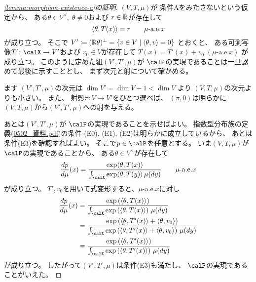 \documentclass[report]{jlreq}
\begin{document}
\begin{proof}[\cref{lemma:morphism-existence-a}の証明]
    $(V, T, \mu)$が
    条件Aをみたさないという仮定から、
    ある$\theta \in V^\vee, \; \theta \neq 0$および
    $r \in \mathbb{R}$が存在して
    \begin{equation}
        \locallabel{eq:costant-pairing}
        \langle \theta, T(x) \rangle
            = r
            \qquad
            \text{$\mu$-a.e.$x$}
    \end{equation}
    が成り立つ。
    そこで
    $V' \coloneqq (\mathbb{R}\theta)^\perp
        = \{ v \in V \mid \langle \theta, v \rangle = 0 \}$
    とおくと、
    ある可測写像$T' \colon \calX \to V'$および
    $v_0 \in V$が存在して
    $T(x) = T'(x) + v_0 \; (\text{$\mu$-a.e.$x$})$
    が成り立つ。
    このように定めた組$(V', T', \mu)$が
    $\calP$の実現であることは一旦認めて最後に示すこととし、
    まず次元と射について確かめる。

    まず
    $(V', T', \mu)$の次元は
    $\dim V' = \dim V - 1 < \dim V$
    より
    $(V, T, \mu)$の次元よりも小さい。
    また、
    射影$\pi \colon V \to V'$をひとつ選べば、
    $(\pi, 0)$は明らかに
    $(V, T, \mu)$から$(V', T', \mu)$への射を与える。

    あとは$(V', T', \mu)$が
    $\calP$の実現であることを示せばよい。
    指数型分布族の定義(\url{0502_資料.pdf})の条件
    (E0), (E1), (E2)は明らかに成立しているから、
    あとは条件(E3)を確認すればよい。
    そこで$p \in \calP$を任意とする。
    いま$(V, T, \mu)$が$\calP$の実現であることから、
    ある$\theta \in V^\vee$が存在して
    \begin{equation}
        \dd[p]{\mu}(x)
            = \frac{
                \exp\langle \theta, T(x) \rangle
            }{
                \int_{\calX} \exp\langle \theta, T(y) \rangle \, \mu(dy)
            }
            \qquad
            \text{$\mu$-a.e.$x$}
    \end{equation}
    が成り立つ。
    $T', v_0$を用いて式変形すると、$\mu$-a.e.$x$に対し
    \begin{alignat}{1}
        \dd[p]{\mu}(x)
            &= \frac{
                \exp\myparen{
                    \langle \theta, T(x) \rangle
                }
            }{
                \int_{\calX} \exp\myparen{
                    \langle \theta, T(x) \rangle
                } \, \mu(dy)
            } \\
            &= \frac{
                \exp\myparen{
                    \langle \theta, T'(x) \rangle
                    + \langle \theta, v_0 \rangle
                }
            }{
                \int_{\calX} \exp\myparen{
                    \langle \theta, T'(x) \rangle
                    + \langle \theta, v_0 \rangle
                } \, \mu(dy)
            } \\
            &= \frac{
                \exp\myparen{
                    \langle \theta, T'(x) \rangle
                }
            }{
                \int_{\calX} \exp\myparen{
                    \langle \theta, T'(x) \rangle
                } \, \mu(dy)
            }
    \end{alignat}
    が成り立つ。
    したがって$(V', T', \mu)$は条件(E3)も満たし、
    $\calP$の実現であることがいえた。
\end{proof}
\end{document}
